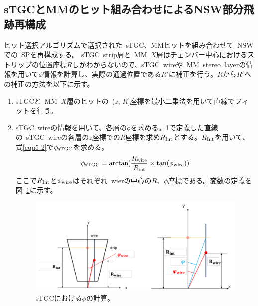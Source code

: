 \subsection{sTGCとMMのヒット組み合わせによるNSW部分飛跡再構成}\label{5-1-2}
ヒット選択アルゴリズムで選択された~sTGC、MMヒットを組み合わせて~NSWでの~SPを再構成する。
sTGC~strip層と~MM~$X$層はチェンバー中心におけるストリップの位置座標$R$しかわからないので、sTGC~wireや~MM~stereo~layerの情報を用いて$\phi$情報を計算し、実際の通過位置である$R'$に補正を行う。$R$から$R'$への補正の方法を以下に示す。
\begin{enumerate}
    \item sTGCと~MM~$X$層のヒットの~($z$, $R$)座標を最小二乗法を用いて直線でフィットを行う。
    \item sTGC~wireの情報を用いて、各層の$\phi$を求める。1で定義した直線の~sTGC~wireの各層の$z$座標での$R$座標を求め$R_{\rm{Int}}$とする。$R_{\rm{Int}}$を用いて、式\eqref{equ5-2}で$\phi_{\rm{sTGC}}$を求める。
    \begin{equation}
        \phi_{\rm{sTGC}}=\arctan(\frac{R_{\rm{wire}}}{R_{\rm{int}}} \times \tan(\phi_{\rm{wire}}))\label{equ5-2}
    \end{equation}
    ここで$R_{\rm{Int}}$と$\phi_{\rm{wire}}$はそれぞれ~wierの中心の$R$、$\phi$座標である。変数の定義を図~\ref{fig:5-2}に示す。
    
    \begin{figure}[h]
        \centering
        \includegraphics[clip, width=12cm]{fig/5/sTGC_phi.png}
        \caption{sTGCにおける$\phi$の計算\cite{article:noguchi}。}
        \label{fig:5-2}
    \end{figure}
        

\end{enumerate}
